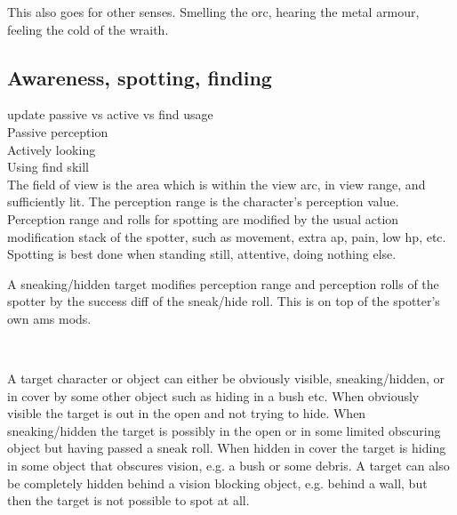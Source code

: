 This also goes for other senses. Smelling the orc, hearing the metal armour, feeling the cold of the wraith.






\subsection*{Awareness, spotting, finding}
\todo update passive vs active vs find usage\\
Passive perception\\
Actively looking\\
Using find skill\\

The field of view is the area which is within the view arc, in view range, and sufficiently lit. The perception range is the character's perception value. Perception range and rolls for spotting are modified by the usual action modification stack of the spotter, such as movement, extra ap, pain, low hp, etc. Spotting is best done when standing still, attentive, doing nothing else.

A sneaking/hidden target modifies perception range and perception rolls of the spotter by the success diff of the sneak/hide roll. This is on top of the spotter's own ams mods.

\

A target character or object can either be obviously visible, sneaking/hidden, or in cover by some other object such as hiding in a bush etc. When obviously visible the target is out in the open and not trying to hide. When sneaking/hidden the target is possibly in the open or in some limited obscuring object but having passed a sneak roll. When hidden in cover the target is hiding in some object that obscures vision, e.g. a bush or some debris. A target can also be completely hidden behind a vision blocking object, e.g. behind a wall, but then the target is not possible to spot at all.

